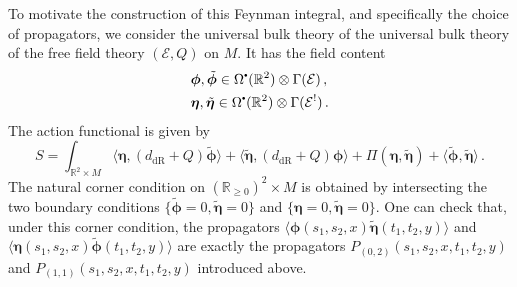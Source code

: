\documentclass[11pt]{article}
\newcommand{\R}{\mathbb{R}}
\newcommand{\derham}{\mathrm{dR}}
\newcommand\sbullet[1][.5]{\mathbin{\vcenter{\hbox{\scalebox{#1}{$\bullet$}}}}}
\numberwithin{equation}{section}
\begin{document}
To motivate the construction of this Feynman integral, and specifically the choice of propagators, we consider the universal bulk theory of the universal bulk theory of the free field theory $(\mathcal{E},Q)$ on $M$. It has the field content
\begin{equation}
	\begin{aligned}
		&\boldsymbol{\phi},\tilde{\boldsymbol{\phi}} \in  \Omega^{\sbullet}(\R^2)\otimes\Gamma(\mathcal{E})\,, \\
		&\boldsymbol{\eta},\tilde{\boldsymbol{\eta}} \in \Omega^{\sbullet}(\R^2)\otimes\Gamma(\mathcal{E}^!)\,.
	\end{aligned}
\end{equation}
The action functional is given by
\begin{equation}
	S = \int_{\R^2\times M} \langle \boldsymbol{\eta}, (d_{\derham} + Q)\tilde{\boldsymbol{\phi}} \rangle + \langle \tilde{\boldsymbol{\eta}}, (d_{\derham} + Q)\boldsymbol{\phi}\rangle + \Pi(\boldsymbol{\eta},\tilde{\boldsymbol{\eta}}) + \langle\tilde{\boldsymbol{\phi}},\tilde{\boldsymbol{\eta}} \rangle\,.
\end{equation}
The natural corner condition on $(\R_{\geq0})^2\times M$ is obtained by intersecting the two boundary conditions $\{\tilde{\boldsymbol{\phi}}=0,\tilde{\boldsymbol{\eta}}=0 \}$ and $\{\boldsymbol{\eta}=0,\tilde{\boldsymbol{\eta}}=0\}$. One can check that, under this corner condition, the propagators $\langle\boldsymbol{\phi}(s_1,s_2,x)\tilde{\boldsymbol{\eta}}(t_1,t_2,y)\rangle$ and $\langle\boldsymbol{\eta}(s_1,s_2,x)\tilde{\boldsymbol{\phi}}(t_1,t_2,y)\rangle$ are exactly the propagators $P_{(0,2)}(s_1,s_2,x,t_1,t_2,y)$ and $P_{(1,1)}(s_1,s_2,x,t_1,t_2,y)$ introduced above. 
\end{document}
